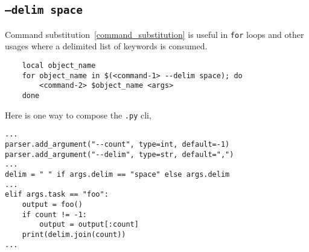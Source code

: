\subsection{\texttt{--delim space}}\label{delim}

Command substitution~\ref{command_substitution} is useful in \texttt{for} loops and other usages where a delimited list of keywords is consumed.
%
\begin{verbatim}
    local object_name
    for object_name in $(<command-1> --delim space); do
        <command-2> $object_name <args>
    done
\end{verbatim}
%
Here is one way to compose the \texttt{.py} cli,
%
\begin{verbatim}
...
parser.add_argument("--count", type=int, default=-1)
parser.add_argument("--delim", type=str, default=",")
...
delim = " " if args.delim == "space" else args.delim
...
elif args.task == "foo":
    output = foo()
    if count != -1:
        output = output[:count]
    print(delim.join(count))
...
\end{verbatim}